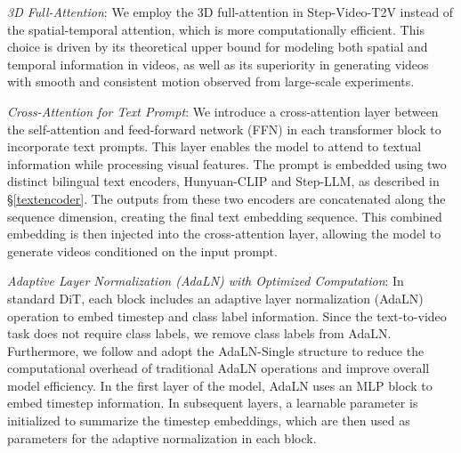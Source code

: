 \textit{3D Full-Attention}: We employ the 3D full-attention in Step-Video-T2V instead of the spatial-temporal attention, which is more computationally efficient. This choice is driven by its theoretical upper bound for modeling both spatial and temporal information in videos, as well as its superiority in generating videos with smooth and consistent motion observed from large-scale experiments.

\textit{Cross-Attention for Text Prompt}: We introduce a cross-attention layer between the self-attention and feed-forward network (FFN) in each transformer block to incorporate text prompts. This layer enables the model to attend to textual information while processing visual features. The prompt is embedded using two distinct bilingual text encoders, Hunyuan-CLIP and Step-LLM, as described in \S\ref{textencoder}. The outputs from these two encoders are concatenated along the sequence dimension, creating the final text embedding sequence. This combined embedding is then injected into the cross-attention layer, allowing the model to generate videos conditioned on the input prompt.

\textit{Adaptive Layer Normalization (AdaLN) with Optimized Computation}: In standard DiT, each block includes an adaptive layer normalization (AdaLN) operation to embed timestep and class label information. Since the text-to-video task does not require class labels, we remove class labels from AdaLN. Furthermore, we follow \cite{chen2023pixartalphafasttrainingdiffusion} and adopt the AdaLN-Single structure to reduce the computational overhead of traditional AdaLN operations and improve overall model efficiency. In the first layer of the model, AdaLN uses an MLP block to embed timestep information. In subsequent layers, a learnable parameter is initialized to summarize the timestep embeddings, which are then used as parameters for the adaptive normalization in each block.

